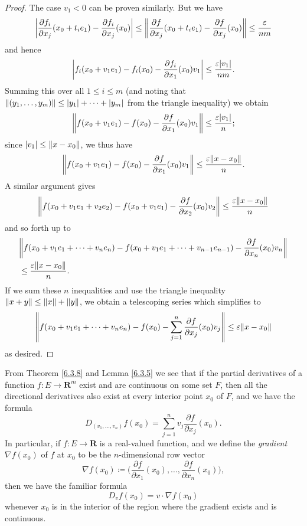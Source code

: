 \begin{proof}
    The case \(v_1 < 0\) can be proven similarly.
    But we have
    \[
        \abs*{\frac{\partial f_i}{\partial x_j}(x_0 + t_i e_1) - \frac{\partial f_i}{\partial x_j}(x_0)} \leq \norm*{\frac{\partial f}{\partial x_j}(x_0 + t_i e_1) - \frac{\partial f}{\partial x_j}(x_0)} \leq \frac{\varepsilon}{nm}
    \]
    and hence
    \[
        \abs*{f_i(x_0 + v_1 e_1) - f_i(x_0) - \frac{\partial f_i}{\partial x_1}(x_0) v_1} \leq \frac{\varepsilon \abs*{v_1}}{nm}.
    \]
    Summing this over all \(1 \leq i \leq m\) (and noting that \(\norm*{(y_1, \dots, y_m)} \leq \abs*{y_1} + \dots + \abs*{y_m}\) from the triangle inequality) we obtain
    \[
        \norm*{f(x_0 + v_1 e_1) - f(x_0) - \frac{\partial f}{\partial x_1}(x_0) v_1} \leq \frac{\varepsilon \abs*{v_1}}{n};
    \]
    since \(\abs*{v_1} \leq \norm*{x - x_0}\), we thus have
    \[
        \norm*{f(x_0 + v_1 e_1) - f(x_0) - \frac{\partial f}{\partial x_1}(x_0) v_1} \leq \frac{\varepsilon \norm*{x - x_0}}{n}.
    \]
    A similar argument gives
    \[
        \norm*{f(x_0 + v_1 e_1 + v_2 e_2) - f(x_0 + v_1 e_1) - \frac{\partial f}{\partial x_2}(x_0) v_2} \leq \frac{\varepsilon \norm*{x - x_0}}{n}
    \]
    and so forth up to
    \begin{align*}
         & \norm*{f(x_0 + v_1 e_1 + \dots + v_n e_n) - f(x_0 + v_1 e_1 + \dots + v_{n - 1} e_{n - 1}) - \frac{\partial f}{\partial x_n}(x_0) v_n} \\
         & \leq \frac{\varepsilon \norm*{x - x_0}}{n}.
    \end{align*}
    If we sum these \(n\) inequalities and use the triangle inequality \(\norm*{x + y} \leq \norm*{x} + \norm*{y}\), we obtain a telescoping series which simplifies to
    \[
        \norm*{f(x_0 + v_1 e_1 + \dots + v_n e_n) - f(x_0) - \sum_{j = 1}^n \frac{\partial f}{\partial x_j}(x_0) v_j} \leq \varepsilon \norm*{x - x_0}
    \]
    as desired.
\end{proof}

\begin{additional corollary}\label{ac 6.3.3}
From Theorem \ref{6.3.8} and Lemma \ref{6.3.5} we see that if the partial derivatives of a function \(f : E \to \mathbf{R}^m\) exist and are continuous on some set \(F\), then all the directional derivatives also exist at every interior point \(x_0\) of \(F\), and we have the formula
\[
    D_{(v_1, \dots, v_n)} f(x_0) = \sum_{j = 1}^n v_j \frac{\partial f}{\partial x_j}(x_0).
\]
In particular, if \(f : E \to \mathbf{R}\) is a real-valued function, and we define the \emph{gradient} \(\nabla f(x_0)\) of \(f\) at \(x_0\) to be the \(n\)-dimensional row vector
\[
    \nabla f(x_0) \coloneqq \bigg(\frac{\partial f}{\partial x_1}(x_0), \dots, \frac{\partial f}{\partial x_n}(x_0)\bigg),
\]
then we have the familiar formula
\[
    D_v f(x_0) = v \cdot \nabla f(x_0)
\]
whenever \(x_0\) is in the interior of the region where the gradient exists and is continuous.
\end{additional corollary}

